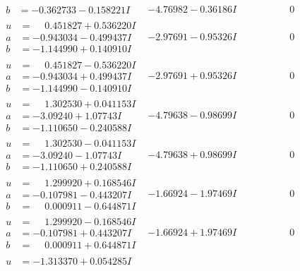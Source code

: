 \documentclass[1p]{elsarticle_modified}
\theoremstyle{definition}
\begin{document}
$$\begin{array}{c|c|c}
\begin{aligned}
b &= -0.362733 - 0.158221 I\end{aligned}
 & -4.76982 - 0.36186 I & \phantom{-0.000000 } 0 \\ \hline\begin{aligned}
u &= \phantom{-}0.451827 + 0.536220 I \\
a &= -0.943034 - 0.499437 I \\
b &= -1.144990 + 0.140910 I\end{aligned}
 & -2.97691 - 0.95326 I & \phantom{-0.000000 } 0 \\ \hline\begin{aligned}
u &= \phantom{-}0.451827 - 0.536220 I \\
a &= -0.943034 + 0.499437 I \\
b &= -1.144990 - 0.140910 I\end{aligned}
 & -2.97691 + 0.95326 I & \phantom{-0.000000 } 0 \\ \hline\begin{aligned}
u &= \phantom{-}1.302530 + 0.041153 I \\
a &= -3.09240 + 1.07743 I \\
b &= -1.110650 - 0.240588 I\end{aligned}
 & -4.79638 - 0.98699 I & \phantom{-0.000000 } 0 \\ \hline\begin{aligned}
u &= \phantom{-}1.302530 - 0.041153 I \\
a &= -3.09240 - 1.07743 I \\
b &= -1.110650 + 0.240588 I\end{aligned}
 & -4.79638 + 0.98699 I & \phantom{-0.000000 } 0 \\ \hline\begin{aligned}
u &= \phantom{-}1.299920 + 0.168546 I \\
a &= -0.107981 - 0.443207 I \\
b &= \phantom{-}0.000911 - 0.644871 I\end{aligned}
 & -1.66924 - 1.97469 I & \phantom{-0.000000 } 0 \\ \hline\begin{aligned}
u &= \phantom{-}1.299920 - 0.168546 I \\
a &= -0.107981 + 0.443207 I \\
b &= \phantom{-}0.000911 + 0.644871 I\end{aligned}
 & -1.66924 + 1.97469 I & \phantom{-0.000000 } 0 \\ \hline\begin{aligned}
u &= -1.313370 + 0.054285 I \\

\end{aligned}
\end{array}$$
\end{document}
